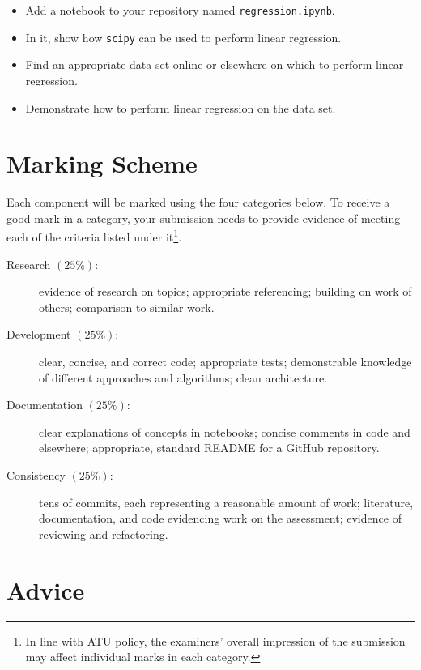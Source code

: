 \documentclass[a4paper]{tufte-handout}
\begin{document}
\begin{itemize}
  \item Add a notebook to your repository named \texttt{regression.ipynb}.
  \item In it, show how \texttt{scipy} can be used to perform linear regression.
  \item Find an appropriate data set online or elsewhere on which to perform linear regression.
  \item Demonstrate how to perform linear regression on the data set.
\end{itemize} 


\section{Marking Scheme}
Each component will be marked using the four categories below.
To receive a good mark in a category, your submission needs to provide evidence of meeting each of the criteria listed under it\footnote{In line with ATU policy, the examiners' overall impression of the submission may affect individual marks in each category.}.

\begin{description}
  \item[Research $(25\%)$:] evidence of research on topics; appropriate referencing; building on work of others; comparison to similar work.
  \item[Development $(25\%)$:] clear, concise, and correct code; appropriate tests; demonstrable knowledge of different approaches and algorithms; clean architecture.
  \item[Documentation $(25\%)$:] clear explanations of concepts in notebooks; concise comments in code and elsewhere; appropriate, standard README for a GitHub repository.
  \item[Consistency $(25\%)$:] tens of commits, each representing a reasonable amount of work; literature, documentation, and code evidencing work on the assessment; evidence of reviewing and refactoring.
\end{description}


\section{Advice}
\end{document}
